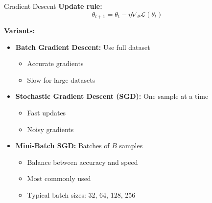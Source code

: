 \documentclass[aspectratio=169]{beamer}
\begin{document}
\begin{frame}{Gradient Descent}
  \textbf{Update rule:}
  \begin{equation}
    \theta_{t+1} = \theta_t - \eta \nabla_\theta \mathcal{L}(\theta_t)
  \end{equation}

  \vspace{0.5em}

  \textbf{Variants:}

  \begin{itemize}
    \item \textbf{Batch Gradient Descent:} Use full dataset
    \begin{itemize}
      \item Accurate gradients
      \item Slow for large datasets
    \end{itemize}

    \item \textbf{Stochastic Gradient Descent (SGD):} One sample at a time
    \begin{itemize}
      \item Fast updates
      \item Noisy gradients
    \end{itemize}

    \item \textbf{Mini-Batch SGD:} Batches of $B$ samples
    \begin{itemize}
      \item Balance between accuracy and speed
      \item Most commonly used
      \item Typical batch sizes: 32, 64, 128, 256
    \end{itemize}
  \end{itemize}
\end{frame}
\end{document}
